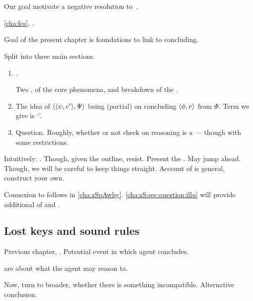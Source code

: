 \chapter{}
\label{cha:zS}

\begin{note}
  Our goal motivate a negative resolution to~\issueConstraint{}.

  \autoref{cha:fcs}, .

  Goal of the present chapter is foundations to link  to concluding.

  Split into three main sections.
  \begin{enumerate}[label=]
  \item
    .

    Two ,  of the core phenomena, and breakdown of the .
  \item

    The idea of \(\langle \langle \psi, v' \rangle, \Psi \rangle\) being (partial) \check{} on concluding \(\langle \phi, v \rangle\) from \(\Phi\).
    Term we give is `\curb{}'.
  \item

    Question.
    Roughly, whether or not check on reasoning is a  --- though with some restrictions.
  \end{enumerate}

  Intuitively: \qWhyV{}.
  Though, given the outline, resist.
  Present the .
  May jump ahead.
  Though, we will be careful to keep things straight.
  Account of  is general, construct your own.

  Connexion to \qWhyV{} follows in \autoref{cha:zSpAwhy}.
  \autoref{cha:zS:sec:question:illu} will provide additional  of \curb{} and \qzS{}.
\end{note}

\section{Lost keys and sound rules}
\label{cha:zS:sec:lost-keys}

\begin{note}
  Previous chapter, .
  Potential event in which agent concludes.

   are about what the agent may reason to.

  Now, turn to broader, whether there is something incompatible.
  Alternative conclusion.
\end{note}

